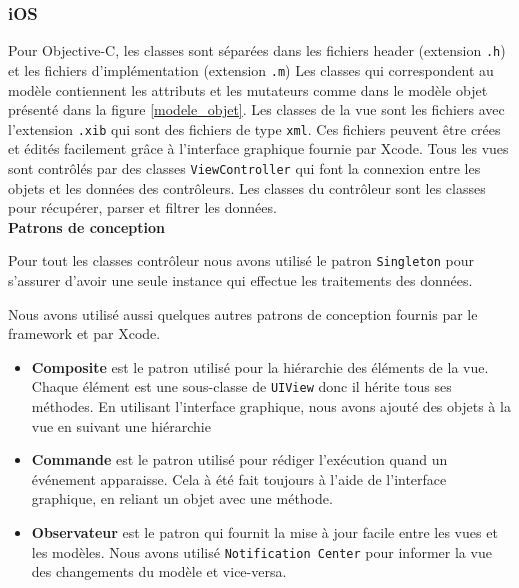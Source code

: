 \documentclass[a4paper, 11px]{article}
\begin{document}
\subsubsection{iOS}
Pour Objective-C, les classes sont séparées dans les fichiers header (extension \texttt{.h}) et les fichiers d'implémentation (extension \texttt{.m})
Les classes qui correspondent au modèle contiennent les attributs et les mutateurs comme dans le modèle objet présenté dans la figure \ref{modele_objet}. Les classes de la vue sont les fichiers avec l'extension \texttt{.xib} qui sont des fichiers de type \texttt{xml}. Ces fichiers peuvent être crées et édités facilement grâce à l'interface graphique fournie par Xcode. Tous les vues sont contrôlés par des classes \texttt{ViewController} qui font la connexion entre les objets et les données des contrôleurs.
Les classes du contrôleur sont les classes pour récupérer, parser et filtrer les données.\\

{\bf Patrons de conception}

Pour tout les classes contrôleur nous avons utilisé le patron \texttt{Singleton} pour s'assurer d'avoir une seule instance qui effectue les traitements des données.

Nous avons utilisé aussi quelques autres patrons de conception fournis par le framework et par Xcode. \\
\begin{itemize}
	\item {\bf Composite} est le patron utilisé pour la hiérarchie des éléments de la vue. Chaque élément est une sous-classe de \texttt{UIView} donc il hérite tous ses méthodes.
En utilisant l'interface graphique, nous avons ajouté des objets à la vue en suivant une hiérarchie\\
	\item {\bf Commande} est le patron utilisé pour rédiger l'exécution quand un événement apparaisse. Cela à été fait toujours à l'aide de l'interface graphique, en reliant un objet avec une méthode.\\
	\item {\bf Observateur} est le patron qui fournit la mise à jour facile entre les vues et les modèles. Nous avons utilisé \texttt{Notification Center} pour informer la vue des changements du modèle et vice-versa.
\end{itemize}
\end{document}
